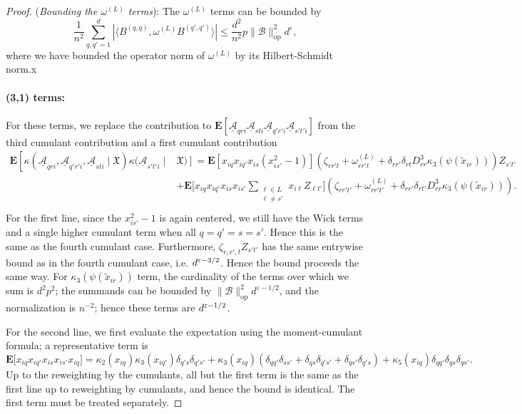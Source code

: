 \documentclass[letterpaper, 10pt, dvipsnames]{article}
\numberwithin{equation}{section}
\newcommand{\Au}{\underline{\mathcal{A}}}
\newcommand{\B}{\mathcal{B}}
\renewcommand{\epsilon}{\varepsilon}
\newcommand{\wt}{\widetilde}
\let\O\relax
\newcommand{\O}[1]{\mathcal{O}\left(#1\right)}
\newcommand{\Eb}{\mathbf{E}}
\theoremstyle{definition}
\begin{document}
\begin{proof}
  \noindent (\textit{Bounding the $\omega^{(L)}$ terms}): The $\omega^{(L)}$ terms can be bounded by
  \[
    \frac{1}{n^2}
    \sum_{q,q'=1}^d
    \left| \langle B^{(q,q)}, \omega^{(L)} B^{(q',q')} \rangle \right|
    \leq \frac{d^2}{n^2} p \|\B\|_{\mathrm{op}}^2 d^{\epsilon},
  \]
  where we have bounded the operator norm of $\omega^{(L)}$ by its Hilbert-Schmidt norm.x

  \paragraph{(3,1) terms:}
  For these terms, we replace the contribution to $\Eb\left[
    \Au_{qri}\Au_{sti}\Au_{q'r'i}\Au_{s't'i}
    \right]$
  from the third cumulant contribution and a first cumulant contribution
    \[
    \begin{aligned}
    \Eb\left[
      \kappa( \Au_{qri},\Au_{q'r'i},\Au_{sti} \mid \mathfrak{X})
      \kappa(\Au_{s't'i} \mid \right. &\left. \mathfrak{X})
    \right]
    = \Eb\left[x_{iq}x_{iq'}x_{is} (x_{is'}^2 - 1) \right] \left( 
      \zeta_{rr't}
      +\omega^{(L)}_{rr't}
      + \delta_{r r'}\delta_{r t} D_{rr}^3 \kappa_3(\psi(\wt{x}_{ir}))\right) Z_{s't'} \\
    &+ \Eb\biggl[x_{iq}x_{iq'}x_{is} x_{is'} \sum_{\substack{\ell \in L \\ \ell \neq s'}} x_{i\ell}Z_{\ell t'}\biggr] \left( 
      \zeta_{rr't'} 
      +\omega^{(L)}_{rr't'}
      + \delta_{r r'}\delta_{r t'} D_{rr}^3 \kappa_3(\psi(\wt{x}_{ir}))\right)\!. \\
    \end{aligned}
    \]
    For the first line, since the $x_{is'}^2-1$ is again centered, we still have the Wick terms and a single higher cumulant term when all $q=q'=s=s'$.  Hence this is the same as the fourth cumulant case.  Furthermore, $\zeta_{r,r',t} Z_{s't'}$ has the same entrywise bound as in the fourth cumulant case, i.e. $\O{d^{\epsilon-3/2}}$.  Hence the bound proceeds the same way.  For $\kappa_3(\psi(\wt{x}_{ir}))$ term, the cardinality of the terms over which we sum is $d^2p^2$; the summands can be bounded by $\|\B\|_{\mathrm{op}}^2 d^{\varepsilon-1/2}$, and the normalization is $n^{-2}$; hence these terms are $\O{d^{\epsilon-1/2}}$.

    For the second line, we first evaluate the expectation using the moment-cumulant formula; a representative term is 
    \[
    \Eb\biggl[x_{iq}x_{iq'}x_{is} x_{is'} x_{iq}\biggr]
    = 
    \kappa_2(x_{iq})\kappa_3(x_{iq'})\delta_{q's}\delta_{q's'}
    +\kappa_3(x_{iq})\left(\delta_{q q'}\delta_{s s'} + \delta_{q s}\delta_{q' s'} + \delta_{q s'}\delta_{q' s}\right) 
    +\kappa_5(x_{iq}) \delta_{q q'} \delta_{q s} \delta_{q s'}.     
    \]
    Up to the reweighting by the cumulants, all but the first term is the same as the first line up to reweighting by cumulants, and hence the bound is identical.  The first term must be treated separately.


\end{proof}
\end{document}
